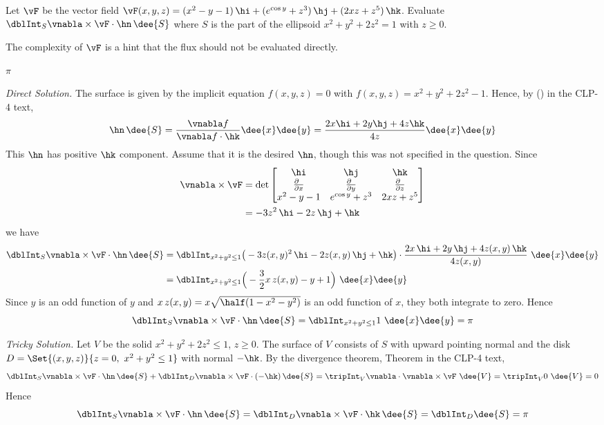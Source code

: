 \begin{question}[M317 2002A] %
Let $\vF$ be the vector field
$\vF(x,y,z)=(x^2-y-1)\,\hi+(e^{\cos y}+z^3)\,\hj+(2xz+z^5)\,\hk$.
Evaluate $\dblInt_S\vnabla\times \vF\cdot\hn\,\dee{S}$ where $S$ is the part
of the ellipsoid $x^2+y^2+2z^2=1$ with $z\ge 0$.
\end{question}

\begin{hint} 
The complexity of $\vF$ is a hint that the flux should
not be evaluated directly.
\end{hint}

\begin{answer} 
$\pi$
\end{answer}

\begin{solution} 
\emph{Direct Solution.}
The surface is given by the implicit equation
$f(x,y,z)=0$ with $f(x,y,z)=x^2+y^2+2z^2-1$. Hence,
 by () in the CLP-4 text,
$$
\hn\,\dee{S}=\frac{\vnabla f}{\vnabla f\cdot\hk}\dee{x}\dee{y}
=\frac{2x\hi+2y\hj+4z\hk}{4z}\dee{x}\dee{y}
$$
This $\hn$ has positive $\hk$ component. Assume that it is the desired
$\hn$, though this was not specified in the question.
Since
\begin{align*}
\vnabla\times\vF
&=\det\left[\begin{matrix}
\hi &\hj &\hk \\
\tfrac{\partial\hfill}{\partial x} & \tfrac{\partial\hfill}{\partial y} & 
                \tfrac{\partial\hfill}{\partial z} \\
x^2-y-1 & e^{\cos y}+z^3 & 2xz+z^5
\end{matrix}
\right] \\
&=-3z^2\,\hi-2z\,\hj+\hk
\end{align*}
we have
\begin{align*}
\dblInt_S\vnabla\times \vF\cdot\hn\,\dee{S}
&=\dblInt_{x^2+y^2\le 1}\big(-3z(x,y)^2\,\hi-2z(x,y)\,\hj+\hk\big)
   \cdot\frac{2x\,\hi+2y\,\hj+4z(x,y)\,\hk}{4z(x,y)}\ \dee{x}\dee{y}
\\
&=\dblInt_{x^2+y^2\le 1}\Big(-\frac{3}{2}x\,z(x,y)-y+1\Big)\ \dee{x}\dee{y}
\end{align*}
Since $y$ is an odd function of $y$ and $x\,z(x,y)=x\sqrt{\half(1-x^2-y^2)}$
is an odd function of $x$, they both integrate to zero. Hence
$$
\dblInt_S\vnabla\times \vF\cdot\hn\,\dee{S}
=\dblInt_{x^2+y^2\le 1}1\ \dee{x}\dee{y}
=\pi
$$

\smallskip
\noindent\emph{Tricky Solution.}
 Let $V$ be the solid $x^2+y^2+2z^2\le 1$,
$z\ge 0$. The surface of $V$ consists of $S$ with upward pointing normal
and the disk $D=\Set{(x,y,z)}{z=0,\ x^2+y^2\le 1}$ with normal $-\hk$.
By the divergence theorem, Theorem  in the CLP-4
text,
$$
\dblInt_S\vnabla\times \vF\cdot\hn\,\dee{S}
+\dblInt_D\vnabla\times \vF\cdot(-\hk)\,\dee{S}
=\tripInt_V\vnabla\cdot\vnabla\times\vF\ \dee{V}
=\tripInt_V 0\ \dee{V}=0
$$
Hence
$$
\dblInt_S\vnabla\times \vF\cdot\hn\,\dee{S}
=\dblInt_D\vnabla\times \vF\cdot\hk\,\dee{S}
=\dblInt_D \dee{S}
=\pi
$$
\end{solution}


